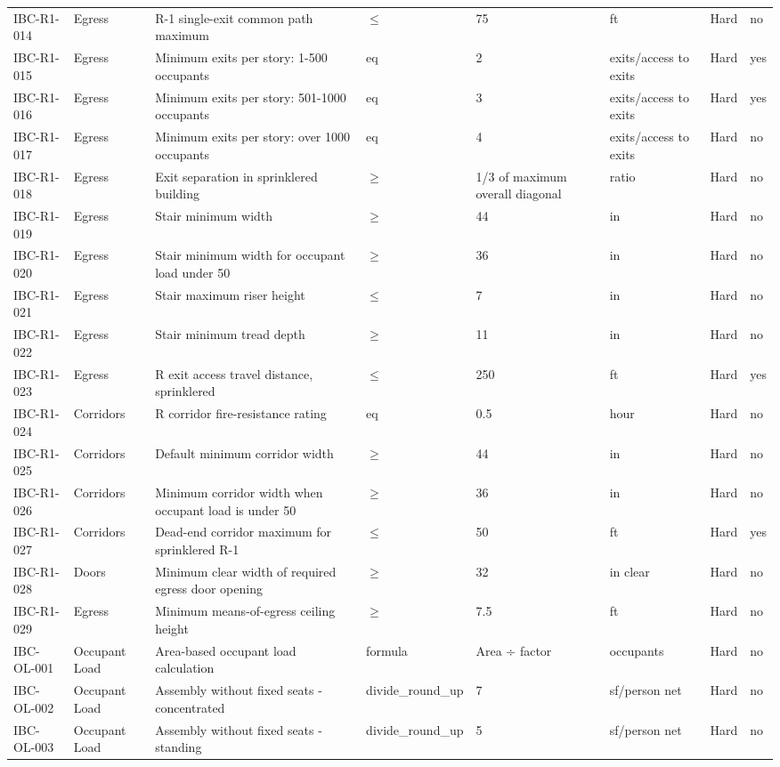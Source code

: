 \documentclass[10pt]{article}
\begin{document}
\begin{longtable}{p{1.6cm}p{2.6cm}p{5.2cm}p{1.1cm}p{1.6cm}p{1.3cm}p{1.3cm}p{1.5cm}}
IBC-R1-014 & Egress & R-1 single-exit common path maximum & $\le$ & 75 & ft & Hard & no \\
IBC-R1-015 & Egress & Minimum exits per story: 1-500 occupants & eq & 2 & exits/access to exits & Hard & yes \\
IBC-R1-016 & Egress & Minimum exits per story: 501-1000 occupants & eq & 3 & exits/access to exits & Hard & yes \\
IBC-R1-017 & Egress & Minimum exits per story: over 1000 occupants & eq & 4 & exits/access to exits & Hard & no \\
IBC-R1-018 & Egress & Exit separation in sprinklered building & $\ge$ & 1/3 of maximum overall diagonal & ratio & Hard & no \\
IBC-R1-019 & Egress & Stair minimum width & $\ge$ & 44 & in & Hard & no \\
IBC-R1-020 & Egress & Stair minimum width for occupant load under 50 & $\ge$ & 36 & in & Hard & no \\
IBC-R1-021 & Egress & Stair maximum riser height & $\le$ & 7 & in & Hard & no \\
IBC-R1-022 & Egress & Stair minimum tread depth & $\ge$ & 11 & in & Hard & no \\
IBC-R1-023 & Egress & R exit access travel distance, sprinklered & $\le$ & 250 & ft & Hard & yes \\
IBC-R1-024 & Corridors & R corridor fire-resistance rating & eq & 0.5 & hour & Hard & no \\
IBC-R1-025 & Corridors & Default minimum corridor width & $\ge$ & 44 & in & Hard & no \\
IBC-R1-026 & Corridors & Minimum corridor width when occupant load is under 50 & $\ge$ & 36 & in & Hard & no \\
IBC-R1-027 & Corridors & Dead-end corridor maximum for sprinklered R-1 & $\le$ & 50 & ft & Hard & yes \\
IBC-R1-028 & Doors & Minimum clear width of required egress door opening & $\ge$ & 32 & in clear & Hard & no \\
IBC-R1-029 & Egress & Minimum means-of-egress ceiling height & $\ge$ & 7.5 & ft & Hard & no \\
IBC-OL-001 & Occupant Load & Area-based occupant load calculation & formula & Area ÷ factor & occupants & Hard & no \\
IBC-OL-002 & Occupant Load & Assembly without fixed seats - concentrated & divide\_round\_up & 7 & sf/person net & Hard & no \\
IBC-OL-003 & Occupant Load & Assembly without fixed seats - standing & divide\_round\_up & 5 & sf/person net & Hard & no \\

\end{longtable}
\end{document}
